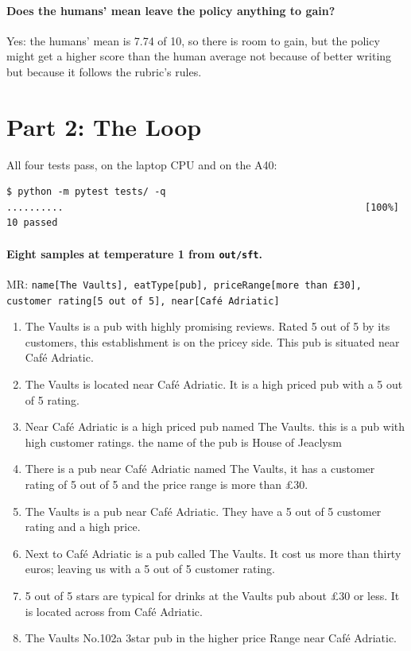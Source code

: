 \documentclass[10pt]{article}
\begin{document}
\paragraph{Does the humans' mean leave the policy anything to gain?}
Yes: the humans' mean is 7.74 of 10, so there is room to gain, but the
policy might get a higher score than the human average not because of
better writing but because it follows the rubric's rules.

\section*{Part 2: The Loop}

All four tests pass, on the laptop CPU and on the A40:
\begin{verbatim}
$ python -m pytest tests/ -q
..........                                                     [100%]
10 passed
\end{verbatim}

\paragraph{Eight samples at temperature 1 from \texttt{out/sft}.}
MR: \texttt{name[The Vaults], eatType[pub], priceRange[more than \pounds30],
customer rating[5 out of 5], near[Café Adriatic]}
\begin{enumerate}\small
\item The Vaults is a pub with highly promising reviews. Rated 5 out of 5 by its customers, this establishment is on the pricey side. This pub is situated near Café Adriatic.
\item The Vaults is located near Café Adriatic.  It is a high priced pub with a 5 out of 5 rating.
\item Near Café Adriatic is a high priced pub named The Vaults. this is a pub with high customer ratings. the name of the pub is House of Jeaclysm
\item There is a pub near Café Adriatic named The Vaults, it has a customer rating of 5 out of 5 and the price range is more than \pounds30.
\item The Vaults is a pub near Café Adriatic. They have a 5 out of 5 customer rating and a high price.
\item Next to Café Adriatic is a pub called The Vaults.   It cost us more than thirty euros; leaving us with a 5 out of 5 customer rating.
\item 5 out of 5 stars are typical for drinks at the Vaults pub about \pounds30 or less. It is located across from Café Adriatic.
\item The Vaults No.102a 3star pub in the higher price Range near Café Adriatic.
\end{enumerate}
\end{document}
